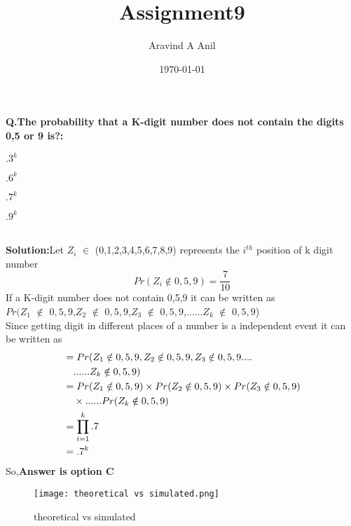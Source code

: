 \documentclass[11pt,a4paper,twocolumn]{article}
\title{Assignment9}
\author{Aravind A Anil}
\date{\today}
\begin{document}
\maketitle
\begin{flushleft}
\textbf{Q.The probability that a K-digit number does not contain the digits 0,5 or 9 is?:}
\end{flushleft}
\begin{enumerate*}[label=\alph*)]
    \item $.3^{k}$\hspace{.5cm}
    \item $.6^{k}$\hspace{.5cm}
    \item $.7^{k}$\hspace{.5cm}
    \item $.9^{k}$\hspace{.5cm}
\end{enumerate*}\\[5pt]
\textbf{Solution:}Let $Z_{i}$ $\in$ (0,1,2,3,4,5,6,7,8,9) represents the $i^{th}$ position of k digit number\\
\begin{equation*}
 Pr(Z_{i}\notin{0,5,9})=\frac{7}{10}   
\end{equation*}
If a K-digit number does not contain 0,5,9 it can be written as\\
$Pr(Z_{1}$ $\notin$ ${0,5,9}$,$Z_{2}$ $\notin$ ${0,5,9}$,$Z_{3}$ $\notin$ ${0,5,9}$,......$Z_{k}$ $\notin$ ${0,5,9}$)\\
Since getting digit in different places of a number is a independent event it can be written as
\begin{align*}
\hspace{-3cm}
&=Pr(Z_{1} \notin {0,5,9},Z_{2} \notin {0,5,9},Z_{3} \notin {0,5,9}....\\
&\quad......Z_{k} \notin {0,5,9})\\
&=Pr(Z_{1} \notin {0,5,9})\times Pr(Z_{2} \notin {0,5,9})\times Pr(Z_{3} \notin {0,5,9}) \\
&\quad\times......Pr(Z_{k} \notin {0,5,9})\\
&=\prod_{i=1}^{k}.7\\
&=.7^{k}
\end{align*}
So,\textbf{Answer is option C}
\begin{figure}
    \centering
    \texttt{[image: theoretical vs simulated.png]}
    \caption{theoretical vs simulated}
    \label{fig:my_label}
\end{figure}
\end{document}
